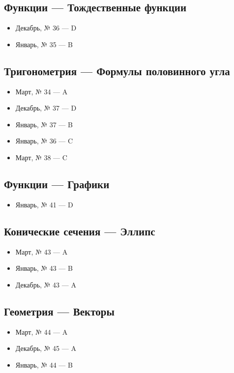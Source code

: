 \subsection*{Функции — Тождественные функции}
\begin{itemize}
\item Декабрь, № 36 — D
\item Январь, № 35 — B
\end{itemize}

\subsection*{Тригонометрия — Формулы половинного угла}
\begin{itemize}
\item Март, № 34 — A
\item Декабрь, № 37 — D
\item Январь, № 37 — B
\item Январь, № 36 — C
\item Март, № 38 — C
\end{itemize}

\subsection*{Функции — Графики}
\begin{itemize}
\item Январь, № 41 — D
\end{itemize}

\subsection*{Конические сечения — Эллипс}
\begin{itemize}
\item Март, № 43 — A
\item Январь, № 43 — B
\item Декабрь, № 43 — A
\end{itemize}

\subsection*{Геометрия — Векторы}
\begin{itemize}
\item Март, № 44 — A
\item Декабрь, № 45 — A
\item Январь, № 44 — B
\end{itemize}

